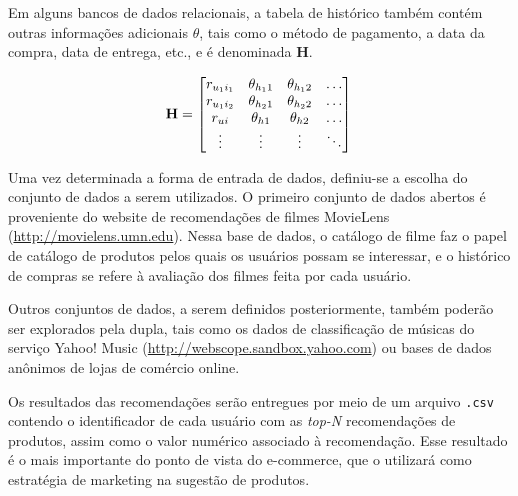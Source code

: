 Em alguns bancos de dados relacionais, a tabela de histórico também contém outras informações adicionais $\theta$, tais como o método de pagamento, a data da compra, data de entrega, etc., e é denominada $\mathbf{H}$.

\begin{equation} 
\mathbf{H} =
\begin{bmatrix} 
 r_{u_1 i_1} &  \theta_{h_1 1} &  \theta_{h_1 2} & \dots   \\
 r_{u_1 i_2} &  \theta_{h_2 1} &  \theta_{h_2 2} & \dots   \\
 r_{u i} &  \theta_{h 1} &  \theta_{h 2} & \dots   \\
 \vdots &  \vdots &  \vdots  & \ddots   \\
 \end{bmatrix} \\
\end{equation}

Uma vez determinada a forma de entrada de dados, definiu-se a escolha do conjunto de dados a serem utilizados. O primeiro conjunto de dados abertos é proveniente do website de recomendações de filmes MovieLens (\url{http://movielens.umn.edu}). Nessa base de dados, o catálogo de filme faz o papel de catálogo de produtos pelos quais os usuários possam se interessar, e o histórico de compras se refere à avaliação dos filmes feita por cada usuário. 

Outros conjuntos de dados,  a serem definidos posteriormente, também poderão ser explorados pela dupla, tais como os dados de classificação de músicas do serviço Yahoo! Music (\url{http://webscope.sandbox.yahoo.com}) ou bases de dados anônimos de lojas de comércio online.

Os resultados das recomendações serão entregues por meio de um arquivo \texttt{.csv} contendo o identificador de cada usuário com as \textit{top-N} recomendações de produtos, assim como o valor numérico associado à recomendação. Esse resultado é o mais importante do ponto de vista do e-commerce, que o utilizará como estratégia de marketing na sugestão de produtos.